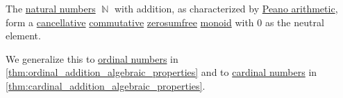 \begin{proposition}\label{thm:natural_number_addition_properties}
  The \hyperref[def:natural_numbers]{natural numbers} \( \BbbN \) with addition, as characterized by \hyperref[def:peano_arithmetic]{Peano arithmetic}, form a \hyperref[def:binary_operation/cancellative]{cancellative} \hyperref[def:binary_operation/commutative]{commutative} \hyperref[def:zerosumfree]{zerosumfree} \hyperref[def:monoid]{monoid} with \( 0 \) as the neutral element.
\end{proposition}
\begin{comments}
  \item We generalize this to \hyperref[def:ordinal]{ordinal numbers} in \cref{thm:ordinal_addition_algebraic_properties} and to \hyperref[def:cardinal]{cardinal numbers} in \cref{thm:cardinal_addition_algebraic_properties}.
\end{comments}
